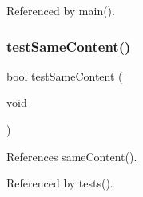 Referenced by main().

\mbox{\label{tests_8c_a7017056d6783f53023d1f1f0336d3d3e}} 
\subsubsection{test\+Same\+Content()}
{\footnotesize\ttfamily bool test\+Same\+Content (\begin{DoxyParamCaption}\item[{void}]{ }\end{DoxyParamCaption})}



References same\+Content().



Referenced by tests().


